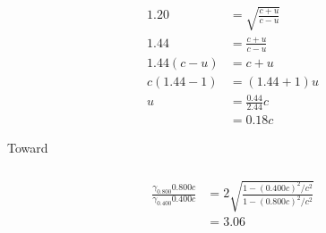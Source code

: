 \documentclass{article}
\begin{document}
\setcounter{subsubsection}{24}
\subsubsection{}

\begin{align*}
  1.20         & = \sqrt{\frac{c + u}{c - u}} \\
  1.44         & = \frac{c + u}{c - u}        \\
  1.44 (c - u) & = c + u                      \\
  c (1.44 - 1) & = (1.44 + 1) u               \\
  u            & = \frac{0.44}{2.44} c        \\
               & = 0.18 c
\end{align*}

Toward

\setcounter{subsubsection}{26}
\subsubsection{}

\begin{align*}
  \frac{\gamma_{0.800} 0.800 c}{\gamma_{0.400} 0.400 c} & = 2 \sqrt{\frac{1 - (0.400 c)^2 / c^2}{1 - (0.800 c)^2 / c^2}} \\
                                                        & = 3.06
\end{align*}

\setcounter{subsubsection}{28}
\subsubsection{}
\end{document}
